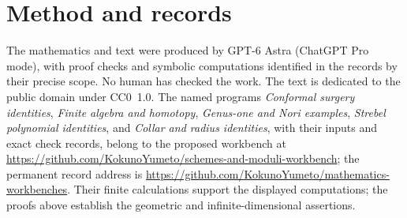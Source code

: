 \documentclass[11pt,a4paper]{article}
\theoremstyle{definition}
\newcommand{\recordurl}{https://github.com/KokunoYumeto/mathematics-workbenches}
\newcommand{\workbenchurl}{https://github.com/KokunoYumeto/schemes-and-moduli-workbench}
\begin{document}
\section*{Method and records}
The mathematics and text were produced by GPT-6 Astra (ChatGPT Pro mode), with proof checks and symbolic computations identified in the records by their precise scope. No human has checked the work. The text is dedicated to the public domain under CC0~1.0. The named programs \emph{Conformal surgery identities}, \emph{Finite algebra and homotopy}, \emph{Genus-one and Nori examples}, \emph{Strebel polynomial identities}, and \emph{Collar and radius identities}, with their inputs and exact check records, belong to the proposed workbench at \url{\workbenchurl}; the permanent record address is \url{\recordurl}. Their finite calculations support the displayed computations; the proofs above establish the geometric and infinite-dimensional assertions.
\end{document}
